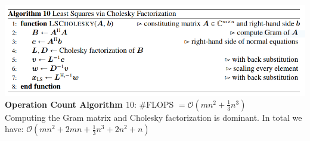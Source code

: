 \documentclass[english]{latex4ei/latex4ei_sheet}
\begin{document}
\begin{sectionbox}
    \includegraphics[width=\textwidth]{img/algo10_ls_with_cholesky.png}\\
    \textbf{Operation Count Algorithm $10$}: \#FLOPS $=\mathcal{O}(mn^2+\frac{1}{3}n^3)$\\
    Computing the Gram matrix and Cholesky factorization is dominant. In total we have:
    $\mathcal{O}(mn^2 + 2mn + \frac{1}{3}n^3 + 2n^2+n)$
\end{sectionbox}
\end{document}

